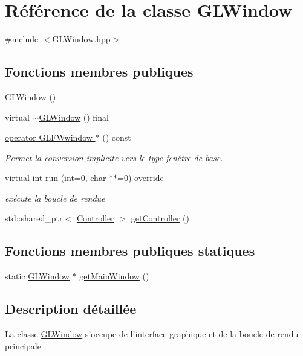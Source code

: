 \hypertarget{classGLWindow}{\section{Référence de la classe G\+L\+Window}
\label{classGLWindow}
}


{\ttfamily \#include $<$G\+L\+Window.\+hpp$>$}

\subsection*{Fonctions membres publiques}
\begin{DoxyCompactItemize}
\item 
\hyperlink{classGLWindow_a728e0fb2a9890114d0371c889af9f95f}{G\+L\+Window} ()
\item 
virtual \hyperlink{classGLWindow_a99612c0043db5f944500bdbd723e902b}{$\sim$\+G\+L\+Window} () final
\item 
\hyperlink{classGLWindow_a77ed0cc5ddcfa47f55b59b123cab5190}{operator G\+L\+F\+Wwindow $\ast$} () const 
\begin{DoxyCompactList}\small\item\em Permet la conversion implicite vers le type fenêtre de base. \end{DoxyCompactList}\item 
virtual int \hyperlink{classGLWindow_a297b34b4bbf69b29516e279839262623}{run} (int=0, char $\ast$$\ast$=0) override
\begin{DoxyCompactList}\small\item\em exécute la boucle de rendue \end{DoxyCompactList}\item 
std\+::shared\+\_\+ptr$<$ \hyperlink{classController}{Controller} $>$ \hyperlink{classGLWindow_a73bff0543adb7c2d3f2be1bd86306579}{get\+Controller} ()
\end{DoxyCompactItemize}
\subsection*{Fonctions membres publiques statiques}
\begin{DoxyCompactItemize}
\item 
static \hyperlink{classGLWindow}{G\+L\+Window} $\ast$ \hyperlink{classGLWindow_a00dbb194ab7a1395bc6f8e4af9d0b34a}{get\+Main\+Window} ()
\end{DoxyCompactItemize}


\subsection{Description détaillée}
La classe \hyperlink{classGLWindow}{G\+L\+Window} s'occupe de l'interface graphique et de la boucle de rendu principale 

